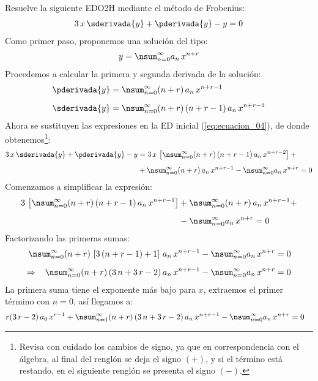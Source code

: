 Resuelve la siguiente EDO2H mediante el método de Frobenius:
\begin{align}
3 \, x \, \sderivada{y} + \pderivada{y} - y = 0
\label{eq:ecuacion_04}    
\end{align}
Como primer paso, proponemos una solución del tipo:
\begin{align*}
y = \nsum_{n=0}^{\infty} a_{n} \, x^{n+r}
\end{align*}
Procedemos a calcular la primera y segunda derivada de la solución:
\begin{align*}
\pderivada{y} &= \nsum_{n=0}^{\infty} (n + r) \, a_{n} \, x^{n+r-1} \\[0.5em]
\sderivada{y} &= \nsum_{n=0}^{\infty} (n + r) \, (n + r - 1) \, a_{n} \, x^{n+r-2}
\end{align*}
Ahora se sustituyen las expresiones en la ED inicial (\ref{eq:ecuacion_04}), de donde obtenemos\footnote{Revisa con cuidado los cambios de signo, ya que en correspondencia con el álgebra, al final del renglón se deja el signo $(+)$, y si el término está restando, en el siguiente renglón se presenta el signo $(-)$.}:
\begin{align*}
3 \, x \, \sderivada{y} + \pderivada{y} - y &= 3 \, x \, \left[  \nsum_{n=0}^{\infty} (n + r) \, (n + r - 1) \, a_{n} \, x^{n+r-2} \right] + \\[0.5em]
&+ \nsum_{n=0}^{\infty} (n + r) \, a_{n} \, x^{n+r-1} - \nsum_{n=0}^{\infty} a_{n} \, x^{n+r} = 0
\end{align*}
Comenzamos a simplificar la expresión:
\begin{align*}
3 \, \left[ \nsum_{n=0}^{\infty} (n + r) \, (n + r - 1) \, a_{n} \, x^{n+r-1} \right] &+ \nsum_{n=0}^{\infty} (n + r) \, a_{n} \, x^{n+r-1} + \\[0.5em]
&- \nsum_{n=0}^{\infty} a_{n} \, x^{n+r} = 0
\end{align*}
Factorizando las primeras sumas:
\begin{align*}
\nsum_{n=0}^{\infty} (n + r) \, \left[ 3 \, (n + r - 1) + 1 \right] \, a_{n} \, x^{n+r-1} - \nsum_{n=0}^{\infty} a_{n} \, x^{n+r} &= 0 \\[0.5em] 
\Rightarrow \hspace{0.3cm} \nsum_{n=0}^{\infty} (n + r) \, (3 \, n + 3 \, r - 2) \, a_{n} \, x^{n+r-1} - \nsum_{n=0}^{\infty} a_{n} \, x^{n+r} &= 0
\end{align*}
La primera suma tiene el exponente más bajo para $x$, extraemos el primer término con $n = 0$, así llegamos a:
\begin{align*}
r (3 \, r - 2) \, a_{0} \, x^{r-1} + \nsum_{n=1}^{\infty} (n + r) \, (3 \, n + 3 \, r - 2) \, a_{n} \, x^{n+r-1} - \nsum_{n=0}^{\infty} a_{n} \, x^{n+r} &= 0
\end{align*}
